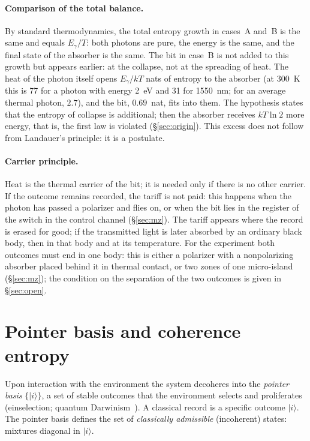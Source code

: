 \documentclass[11pt,a4paper]{article}
\newcommand{\Sref}[1]{\hyperref[#1]{\S\ref{#1}}}
\begin{document}
\paragraph{Comparison of the total balance.}
By standard thermodynamics, the total entropy growth in cases~A and~B is the same and equals $E_\gamma/T$: both photons are pure, the energy is the same, and the final state of the absorber is the same. The bit in case~B is not added to this growth but appears earlier: at the collapse, not at the spreading of heat. The heat of the photon itself opens $E_\gamma/kT$ nats of entropy to the absorber (at 300~K this is 77 for a photon with energy 2~eV and 31 for 1550~nm; for an average thermal photon, $2.7$), and the bit, $0.69$~nat, fits into them. The hypothesis states that the entropy of collapse is additional; then the absorber receives $kT\ln 2$ more energy, that is, the first law is violated (\Sref{sec:origin}). This excess does not follow from Landauer's principle: it is a postulate.

\paragraph{Carrier principle.}
Heat is the thermal carrier of the bit; it is needed only if there is no other carrier. If the outcome remains recorded, the tariff is not paid: this happens when the photon has passed a polarizer and flies on, or when the bit lies in the register of the switch in the control channel (\Sref{sec:mz}). The tariff appears where the record is erased for good; if the transmitted light is later absorbed by an ordinary black body, then in that body and at its temperature. For the experiment both outcomes must end in one body: this is either a polarizer with a nonpolarizing absorber placed behind it in thermal contact, or two zones of one micro-island (\Sref{sec:mz}); the condition on the separation of the two outcomes is given in \Sref{sec:open}.

\section{Pointer basis and coherence entropy}\label{sec:pointer}

Upon interaction with the environment the system decoheres into the \emph{pointer basis} $\{|i\rangle\}$, a set of stable outcomes that the environment selects and proliferates (einselection; quantum Darwinism~\cite{zurek2009}). A classical record is a specific outcome $|i\rangle$. The pointer basis defines the set of \emph{classically admissible} (incoherent) states: mixtures diagonal in $|i\rangle$.
\end{document}
